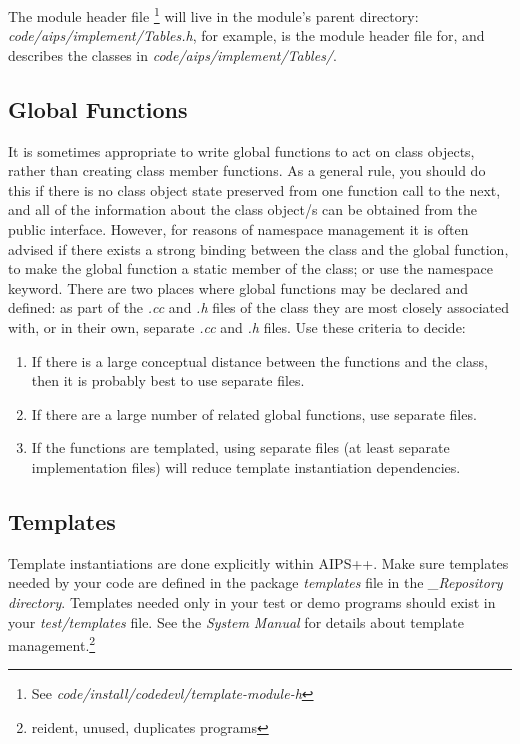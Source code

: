 The module header file \footnote{See {\em
code/install/codedevl/template-module-h}} will live in the module's parent
directory: {\em code/aips/implement/Tables.h}, for example, is the module
header file for, and describes the classes in 
{\em code/aips/implement/Tables/}.
\subsection {Global Functions} It is sometimes appropriate to write
global functions to act on class objects, rather than creating
class member functions.  As a general rule, you should do this if
there is no class object state preserved from one function call to the next,
and all of the information about the class object/s can be obtained
from the public interface.  \bmar However, for reasons of namespace
management it
is often advised if there exists a strong binding between the class and the
global function, to make the global function a static member of the class; or
use the namespace keyword.
There are two places where global functions
may be declared and defined:  as part of the {\em .cc} and {\em .h} files
of the class they are most closely associated with, or in their own, separate 
{\em .cc} and {\em .h} files.  Use these criteria to decide:
\begin{enumerate}
\item If there is a large conceptual distance between the functions and
the class, then it is probably best to use separate files.
\item If there are a large number of related global functions, use
separate files.
\item If the functions are templated, using separate files (at least separate
implementation \bmar files) will reduce
template instantiation dependencies.
\end{enumerate}
\subsection {Templates} \bmar Template instantiations are done explicitly
within AIPS++. Make sure templates needed by your code are defined in the
package {\it templates} file in the {\it \_Repository directory}. Templates
needed only in your test or demo programs should exist in your {\it
test/templates} file. See the {\em System Manual} for details about template
management.\footnote {reident, unused, duplicates programs}
